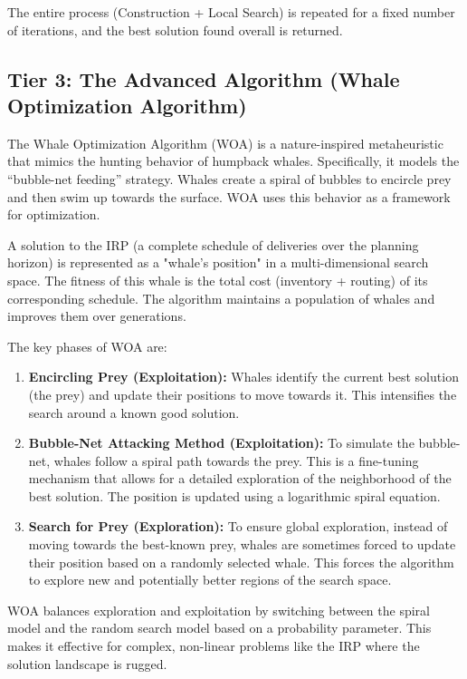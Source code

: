 \documentclass{article}
\begin{document}
The entire process (Construction + Local Search) is repeated for a fixed number of iterations, and the best solution found overall is returned.



\subsection{Tier 3: The Advanced Algorithm (Whale Optimization Algorithm)}

The Whale Optimization Algorithm (WOA) is a nature-inspired metaheuristic that mimics the hunting behavior of humpback whales. Specifically, it models the ``bubble-net feeding'' strategy. Whales create a spiral of bubbles to encircle prey and then swim up towards the surface. WOA uses this behavior as a framework for optimization.

A solution to the IRP (a complete schedule of deliveries over the planning horizon) is represented as a "whale's position" in a multi-dimensional search space. The fitness of this whale is the total cost (inventory + routing) of its corresponding schedule. The algorithm maintains a population of whales and improves them over generations.

The key phases of WOA are:
\begin{enumerate}
    \item \textbf{Encircling Prey (Exploitation):} Whales identify the current best solution (the prey) and update their positions to move towards it. This intensifies the search around a known good solution.
    \item \textbf{Bubble-Net Attacking Method (Exploitation):} To simulate the bubble-net, whales follow a spiral path towards the prey. This is a fine-tuning mechanism that allows for a detailed exploration of the neighborhood of the best solution. The position is updated using a logarithmic spiral equation.
    \item \textbf{Search for Prey (Exploration):} To ensure global exploration, instead of moving towards the best-known prey, whales are sometimes forced to update their position based on a randomly selected whale. This forces the algorithm to explore new and potentially better regions of the search space.
\end{enumerate}

WOA balances exploration and exploitation by switching between the spiral model and the random search model based on a probability parameter. This makes it effective for complex, non-linear problems like the IRP where the solution landscape is rugged.
\end{document}
